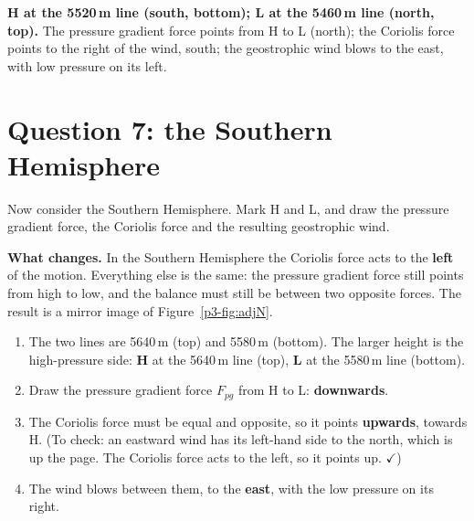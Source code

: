 \begin{answerbox}
\textbf{H at the 5520\,m line (south, bottom); L at the 5460\,m line (north, top).} The pressure gradient force points from H to L (north); the Coriolis force points to the right of the wind, south; the geostrophic wind blows to the east, with low pressure on its left.
\end{answerbox}

\section{Question 7: the Southern Hemisphere}

\begin{questionbox}
Now consider the Southern Hemisphere. Mark H and L, and draw the pressure gradient force, the Coriolis force and the resulting geostrophic wind.
\end{questionbox}

\textbf{What changes.} In the Southern Hemisphere the Coriolis force acts to the \textbf{left} of the motion. Everything else is the same: the pressure gradient force still points from high to low, and the balance must still be between two opposite forces. The result is a mirror image of Figure~\ref{p3-fig:adjN}.

\begin{enumerate}[label=\textbf{Step \arabic*.},leftmargin=*,itemsep=3pt]
\item The two lines are 5640\,m (top) and 5580\,m (bottom). The larger height is the high-pressure side: \textbf{H} at the 5640\,m line (top), \textbf{L} at the 5580\,m line (bottom).
\item Draw the pressure gradient force $F_{pg}$ from H to L: \textbf{downwards}.
\item The Coriolis force must be equal and opposite, so it points \textbf{upwards}, towards H. (To check: an eastward wind has its left-hand side to the north, which is up the page. The Coriolis force acts to the left, so it points up. \ensuremath{\checkmark})
\item The wind blows between them, to the \textbf{east}, with the low pressure on its right.
\end{enumerate}

